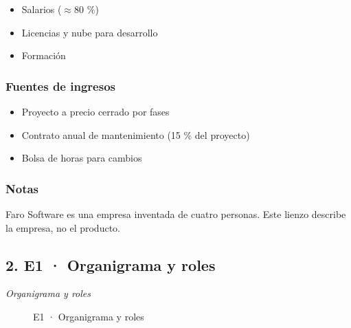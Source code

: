 \begin{itemize}
\item Salarios ($\approx$80 \%)
\item Licencias y nube para desarrollo
\item Formación
\end{itemize}

\subsubsection*{Fuentes de ingresos}

\begin{itemize}
\item Proyecto a precio cerrado por fases
\item Contrato anual de mantenimiento (15 \% del proyecto)
\item Bolsa de horas para cambios
\end{itemize}

\subsubsection*{Notas}

Faro Software es una empresa inventada de cuatro personas. Este lienzo describe la empresa, no el producto.

\subsection*{2. E1 · Organigrama y roles}

\emph{Organigrama y roles}

\begin{figure}[H]
\centering
{}
\caption{E1 · Organigrama y roles}
\end{figure}

